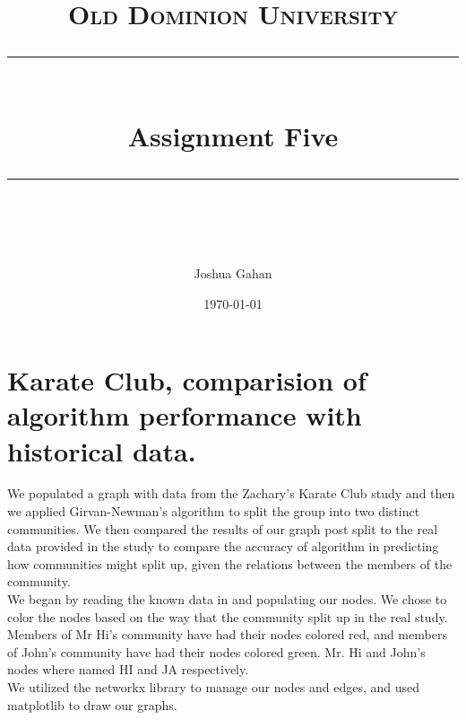 \documentclass[11pt]{article}
\title{	
	\normalfont\normalsize
	\textsc{Old Dominion University}\\ %
	\vspace{25pt} %
	\rule{\linewidth}{0.5pt}\\ %
	\vspace{20pt} %
	{\huge Assignment Five}\\ %
	\vspace{12pt} %
	\rule{\linewidth}{2pt}\\ %
	\vspace{20pt} %
}
\author{\LARGE Joshua Gahan} %
\date{\normalsize\today} %
\begin{document}
	\maketitle %
	\newpage
	
	\section{Karate Club, comparision of algorithm performance with historical data. }
	\hspace{10mm} We populated a graph with data from the Zachary's Karate Club study and then we applied Girvan-Newman's algorithm to split the group into two distinct communities. We then compared the results of our graph post split to the real data provided in the study to compare the accuracy of algorithm in predicting how communities might split up, given the relations between the members of the community. \\
	\hspace{10mm} We began by reading the known data in and populating our nodes. We chose to color the nodes based on the way that the community split up in the real study. Members of Mr Hi's community have had their nodes colored red, and members of John's community have had their nodes colored green. Mr. Hi and John's nodes where named HI and JA respectively.  \\
	\hspace{10mm} We utilized the networkx library to manage our nodes and edges, and used matplotlib to draw our graphs. 
\end{document}
